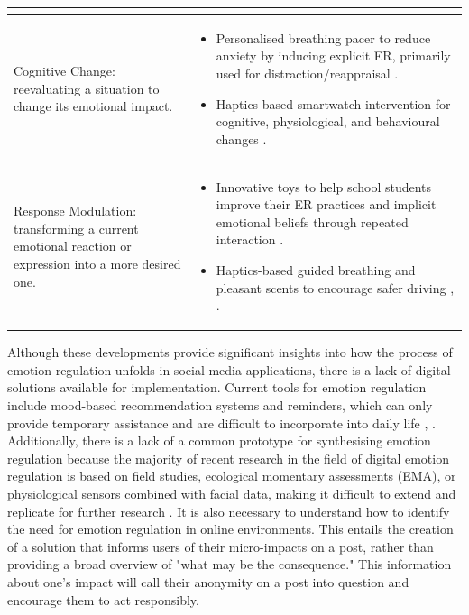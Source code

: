 \documentclass[acmtog]{acmart}
\begin{document}
\begin{table}[htbp]
\begin{tabular}{m{6cm}m{10cm}}
\begin{itemize}
\end{itemize}                                       \\ \hline
Cognitive Change: reevaluating a situation to change its emotional impact.                                                               & \begin{itemize}
\item Personalised breathing pacer to reduce anxiety by inducing explicit ER, primarily used for distraction/reappraisal \cite{miri2020evaluating}.
\item Haptics-based smartwatch intervention for cognitive, physiological, and behavioural changes \cite{costa2019boostmeup}.
\end{itemize}                        \\ \hline
Response Modulation: transforming a current emotional reaction or expression into a more desired one.                                    & \begin{itemize}
\item Innovative toys to help school students improve their ER practices and implicit emotional beliefs through repeated interaction \cite{theofanopoulou2019smart}.
\item Haptics-based guided breathing and pleasant scents to encourage safer driving \cite{paredes2018just}, \cite{dmitrenko2020caroma}.
\end{itemize}                      \\ \hline
\end{tabular}
\end{table}

Although these developments provide significant insights into how the process of emotion regulation unfolds in social media applications, there is a lack of digital solutions available for implementation. Current tools for emotion regulation include mood-based recommendation systems and reminders, which can only provide temporary assistance and are difficult to incorporate into daily life \cite{wadley2020digital}, \cite{slovak2022designing}. Additionally, there is a lack of a common prototype for synthesising emotion regulation because the majority of recent research in the field of digital emotion regulation is based on field studies, ecological momentary assessments (EMA), or physiological sensors combined with facial data, making it difficult to extend and replicate for further research \cite{ruensuk2020you}. It is also necessary to understand how to identify the need for emotion regulation in online environments. This entails the creation of a solution that informs users of their micro-impacts on a post, rather than providing a broad overview of "what may be the consequence." This information about one's impact will call their anonymity on a post into question and encourage them to act responsibly.
\end{document}
